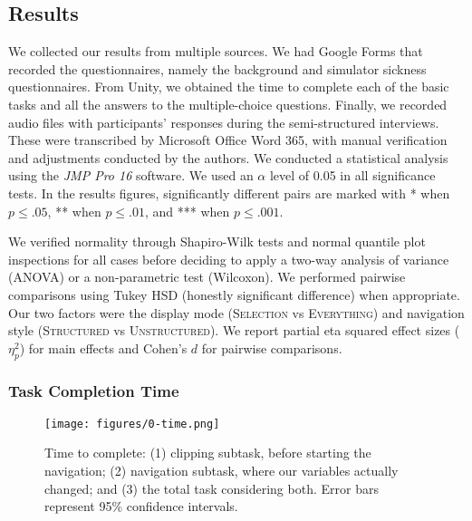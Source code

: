 \subsection{Results}
We collected our results from multiple sources. We had Google Forms that recorded the questionnaires, namely the background and simulator sickness questionnaires. From Unity, we obtained the time to complete each of the basic tasks and all the answers to the multiple-choice questions. Finally, we recorded audio files with participants' responses during the semi-structured interviews. These were transcribed by Microsoft Office Word 365, with manual verification and adjustments conducted by the authors. We conducted a statistical analysis using the \textit{JMP Pro 16} software. We used an $\alpha$ level of 0.05 in all significance tests. In the results figures, significantly different pairs are marked with * when $p\leq.05$, ** when $p\leq.01$, and *** when $p\leq.001$.

We verified normality through Shapiro-Wilk tests and normal quantile plot inspections for all cases before deciding to apply a two-way analysis of variance (ANOVA) or a non-parametric test (Wilcoxon). We performed pairwise comparisons using Tukey HSD (honestly significant difference) when appropriate. Our two factors were the display mode (\textsc{Selection} vs \textsc{Everything}) and navigation style (\textsc{Structured} vs \textsc{Unstructured}). We report partial eta squared effect sizes ($\eta_p^2$) for main effects and Cohen's $d$ for pairwise comparisons.

\subsubsection{Task Completion Time}

\begin{figure*}[tb]
 \centering
 \texttt{[image: figures/0-time.png]}
 \caption{Time to complete: (1) clipping subtask, before starting the navigation; (2) navigation subtask, where our variables actually changed; and (3) the total task considering both. Error bars represent 95\% confidence intervals. }
 \label{fig:results}
 \vspace{-4mm}
\end{figure*}

